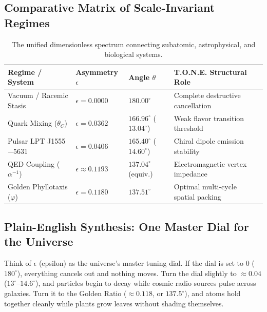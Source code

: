 \documentclass[11pt,a4paper,oneside]{article}
\def\texttt#1{#1}%
\theoremstyle{definition}
\begin{document}
\subsection{Comparative Matrix of Scale-Invariant Regimes}
\begin{table}[h]
\centering
\small
\begin{tabular}{@{} p{3.6cm} l l p{4.4cm} @{}}
\toprule
\textbf{Regime / System} & \textbf{Asymmetry $\epsilon$} & \textbf{Angle $\theta$} & \textbf{T.O.N.E. Structural Role} \\ \midrule
Vacuum / Racemic Stasis & $\epsilon = 0.0000$ & $180.00^\circ$ & Complete destructive cancellation \\ \addlinespace[4pt]
Quark Mixing ($\theta_C$) & $\epsilon = 0.0362$ & $166.96^\circ$ ($13.04^\circ$) & Weak flavor transition threshold \\ \addlinespace[4pt]
Pulsar \texttt{LPT J1555$-$5631} & $\epsilon = 0.0406$ & $165.40^\circ$ ($14.60^\circ$) & Chiral dipole emission stability \\ \addlinespace[4pt]
QED Coupling ($\alpha^{-1}$) & $\epsilon \approx 0.1193$ & $137.04^\circ$ (equiv.) & Electromagnetic vertex impedance \\ \addlinespace[4pt]
Golden Phyllotaxis ($\varphi$) & $\epsilon = 0.1180$ & $137.51^\circ$ & Optimal multi-cycle spatial packing \\ \bottomrule
\end{tabular}
\caption{The unified dimensionless spectrum connecting subatomic, astrophysical, and biological systems.}
\end{table}

\subsection{Plain-English Synthesis: One Master Dial for the Universe}
\begin{noobbox}
Think of $\epsilon$ (epsilon) as the universe's master tuning dial. If the dial is set to $0$ ($180^\circ$), everything cancels out and nothing moves. Turn the dial slightly to $\approx 0.04$ ($13^\circ$--$14.6^\circ$), and particles begin to decay while cosmic radio sources pulse across galaxies. Turn it to the Golden Ratio ($\approx 0.118$, or $137.5^\circ$), and atoms hold together cleanly while plants grow leaves without shading themselves.
\end{noobbox}
\end{document}

